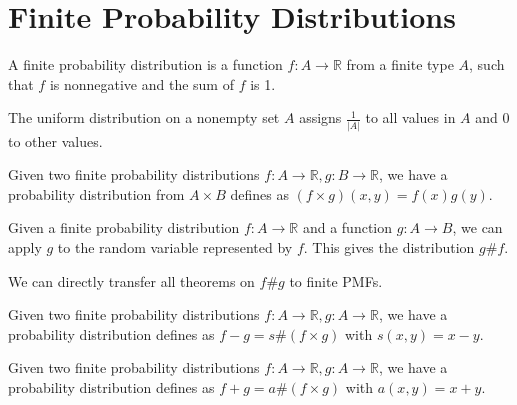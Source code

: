 \chapter{Finite Probability Distributions}
\label{chap:finpmf}

\begin{definition}
    \label{FinPMF}
    \leanok
    A finite probability distribution is a function $f : A \to \mathbb{R}$ from a finite type $A$, such that $f$ is nonnegative and the sum of $f$ is
    1.
\end{definition}

\begin{definition}
    \label{Uniform}
    \leanok
    The uniform distribution on a nonempty set $A$ assigns $\frac1{|A|}$ to all values in $A$ and $0$ to other values.
\end{definition}

\begin{definition}
    \label{instMulFinPMF}
    \leanok
    Given two finite probability distributions $f: A \to \mathbb{R}, g : B \to \mathbb{R}$, we have a probability distribution
    from $A \times B$ defines as $(f \times g)(x, y) = f(x) g(y)$.
\end{definition}

\begin{definition}
    \label{FinPMF.apply}
    \leanok
    Given a finite probability distribution $f: A \to \mathbb{R}$ and a function $g : A \to B$, we can apply $g$ to the random variable
    represented by $f$. This gives the distribution $g \# f$.
\end{definition}

We can directly transfer all theorems on $f \# g$ to finite PMFs.

\begin{definition}
    \label{instSubFinPMF}
    \leanok
    Given two finite probability distributions $f: A \to \mathbb{R}, g : A \to \mathbb{R}$, we have a probability distribution
    defines as $f-g = s \# (f \times g)$ with $s(x, y) = x-y$.
\end{definition}

\begin{definition}
    \label{instAddFinPMF}
    \leanok
    Given two finite probability distributions $f: A \to \mathbb{R}, g : A \to \mathbb{R}$, we have a probability distribution
    defines as $f+g = a \# (f \times g)$ with $a(x, y) = x+y$.
\end{definition}

